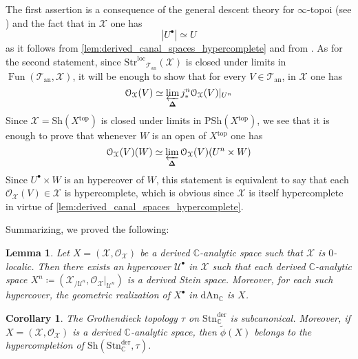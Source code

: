 \documentclass[12pt,a4paper,reqno]{amsart}
\theoremstyle{plain}
\newtheorem{lem}[thm]{Lemma}
\newtheorem{cor}[thm]{Corollary}
\theoremstyle{definition}
\theoremstyle{remark}
\numberwithin{equation}{section}
\begin{document}
The first assertion is a consequence of the general descent theory for $\infty$-topoi (see \cite[Theorem 6.1.3.9]{HTT}) and the fact that in ${\mathcal X}$ one has
\[ |U^\bullet| \simeq U \]
as it follows from \cref{lem:derived_canal_spaces_hypercomplete} and from \cite[6.5.3.12]{HTT}.
{\ignorespaces}
As for the second statement, since ${\mathrm{Str}^\mathrm{loc}}_{{\mathcal T}_{\mathrm{an}}}({\mathcal X})$ is closed under limits in $\operatorname{Fun}({{\mathcal T}_{\mathrm{an}}}, {\mathcal X})$, it will be enough to show that for every $V \in {{\mathcal T}_{\mathrm{an}}}$, in ${\mathcal X}$ one has
\[ {\mathcal O}_{\mathcal X}(V) \simeq \varprojlim_{\mathbf \Delta} j^n_* {\mathcal O}_{\mathcal X}(V) |_{U^n} \]
Since ${\mathcal X} = {\mathrm{Sh}}(X{^\mathrm{top}})$ is closed under limits in ${\mathrm{PSh}}(X{^\mathrm{top}})$, we see that it is enough to prove that whenever $W$ is an open of $X{^\mathrm{top}}$ one has
\[ {\mathcal O}_{\mathcal X}(V)(W) \simeq \varprojlim_{\mathbf \Delta} {\mathcal O}_{\mathcal X}(V)(U^n \times W) \]
Since $U^\bullet \times W$ is an hypercover of $W$, this statement is equivalent to say that each ${\mathcal O}_{\mathcal X}(V) \in {\mathcal X}$ is hypercomplete, which is obvious since ${\mathcal X}$ is itself hypercomplete in virtue of \cref{lem:derived_canal_spaces_hypercomplete}.

Summarizing, we proved the following:

\begin{lem} \label{lem:derived_Stein_hypercover}
	Let $X = ({\mathcal X}, {\mathcal O}_{\mathcal X})$ be a derived {$\mathbb C$-analytic\xspace} space such that ${\mathcal X}$ is $0$-localic.
	Then there exists an hypercover $\mathcal U^\bullet$ in ${\mathcal X}$ such that each derived {$\mathbb C$-analytic\xspace} space $X^n \coloneqq ({\mathcal X}_{/\mathcal U^n}, {\mathcal O}_{\mathcal X}|_{\mathcal U^n})$ is a derived Stein space.
	Moreover, for each such hypercover, the geometric realization of $X^\bullet$ in ${\mathrm{dAn}_{\mathbb C}}$ is $X$.
\end{lem}

\begin{cor} \label{cor:little_phi_hypersheaves}
	The Grothendieck topology $\tau$ on ${\mathrm{Stn}^{\mathrm{der}}_{\mathbb C}}$ is subcanonical.
	Moreover, if $X = ({\mathcal X}, {\mathcal O}_{\mathcal X})$ is a derived {$\mathbb C$-analytic\xspace} space, then $\widetilde{\phi}(X)$ belongs to the hypercompletion of ${\mathrm{Sh}}({\mathrm{Stn}^{\mathrm{der}}_{\mathbb C}}, \tau)$.
\end{cor}
\end{document}

